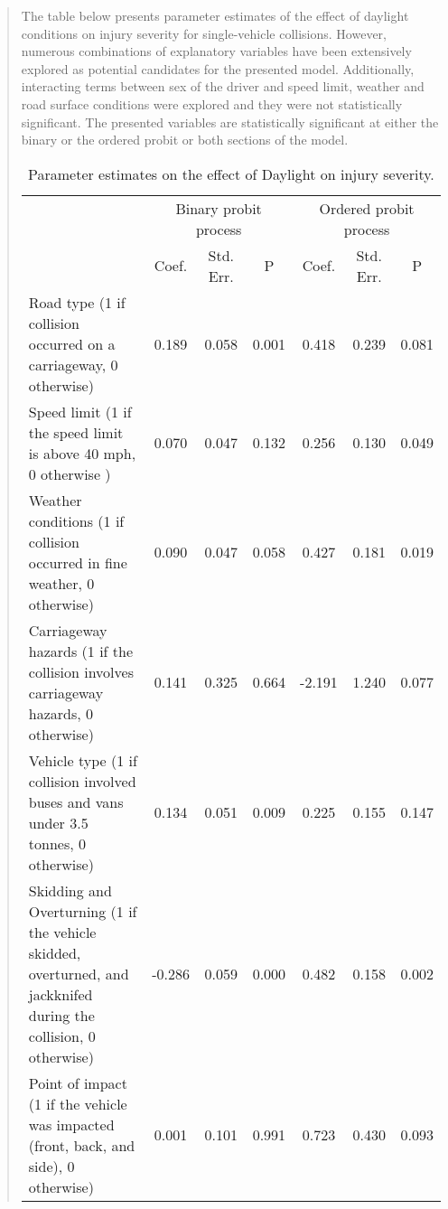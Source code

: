 \documentclass[12]{report}
\begin{document}
\begin{quote}
{\clearpage
The table below presents parameter estimates of the effect of daylight conditions on injury severity for single-vehicle collisions. However, numerous combinations of explanatory variables have been extensively explored as potential candidates for the presented model. Additionally, interacting terms between sex of the driver and speed limit, weather and road surface conditions were explored and they were not statistically significant. The presented variables are statistically significant at either the binary or the ordered probit or both sections of the model.

\begin{table}[H]
\renewcommand{\arraystretch}{1.3}
\centering
\caption{Parameter estimates on the effect of Daylight on injury severity.}
\begin{tabular}{p{10.2cm} ccc ccc}
\toprule
 & \multicolumn{3}{c}{Binary probit process} & \multicolumn{3}{c}{Ordered probit process} \\
\cmidrule(r){2-4} \cmidrule(r){5-7}
& Coef. & Std. Err. & P & Coef. & Std. Err. & P \\
\midrule
Road type (1 if collision occurred on a carriageway, 0 otherwise)  & 0.189 & 0.058 & 0.001 & 0.418 & 0.239 & 0.081 \\

Speed limit (1 if the speed limit is above 40 mph, 0 otherwise ) & 0.070 & 0.047 & 0.132 & 0.256 & 0.130 & 0.049 \\

Weather conditions (1 if collision occurred in fine weather, 0 otherwise) & 0.090 & 0.047 & 0.058 & 0.427 & 0.181 & 0.019 \\

Carriageway hazards (1 if the collision involves carriageway hazards, 0 otherwise) & 0.141 & 0.325 & 0.664 & -2.191 & 1.240 & 0.077 \\

Vehicle type (1 if collision involved buses and vans under 3.5 tonnes, 0 otherwise) & 0.134 & 0.051 & 0.009 & 0.225 & 0.155 & 0.147 \\

Skidding and Overturning (1 if the vehicle skidded, overturned, and jackknifed during the collision, 0 otherwise) & -0.286 & 0.059 & 0.000 & 0.482 & 0.158 & 0.002 \\

Point of impact (1 if the vehicle was impacted (front, back, and side), 0 otherwise) & 0.001 & 0.101 & 0.991 & 0.723 & 0.430 & 0.093 \\


\end{tabular}
\end{table}}
\end{quote}
\end{document}
